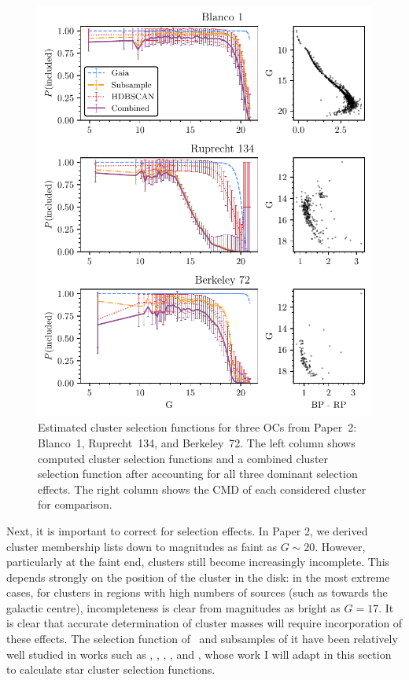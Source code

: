 \begin{figure}[p]
    \centering
    \includegraphics[width=\textwidth]{fig/c4/mass_selection_functions.pdf}
    \caption[Estimated cluster selection functions for three OCs from Paper~2: Blanco~1, Ruprecht~134, and Berkeley~72]{Estimated cluster selection functions for three OCs from Paper~2: Blanco~1, Ruprecht~134, and Berkeley~72. The left column shows computed cluster selection functions and a combined cluster selection function after accounting for all three dominant selection effects. The right column shows the CMD of each considered cluster for comparison.}
    \label{fig:dynamics:masses:selection_effects}
\end{figure}


Next, it is important to correct for selection effects. In Paper 2, we derived cluster membership lists down to magnitudes as faint as $G\sim20$. However, particularly at the faint end, clusters still become increasingly incomplete. This depends strongly on the position of the cluster in the disk: in the most extreme cases, for clusters in regions with high numbers of sources (such as towards the galactic centre), incompleteness is clear from magnitudes as bright as $G=17$. It is clear that accurate determination of cluster masses will require incorporation of these effects. The selection function of \gaia\ and subsamples of it have been relatively well studied in works such as \cite{boubert_completeness_2020,boubert_completeness_2020-1}, \cite{boubert_completeness_2020-1}, \cite{rix_selection_functions_2021}, \cite{cantat-gaudin_empirical_model_2023}, and \cite{castro-ginard_estimating_selection_2023}, whose work I will adapt in this section to calculate star cluster selection functions.

